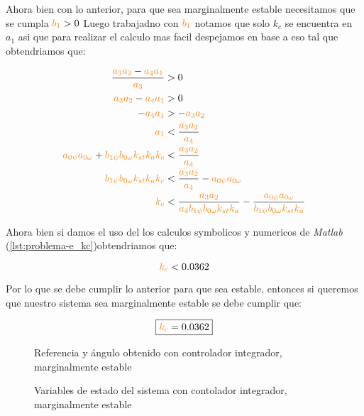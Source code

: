 Ahora bien con lo anterior, para que sea marginalmente estable necesitamos que se cumpla  \(\nara{b_1} > 0\)     
Luego trabajadno con $\nara{b_1}$ notamos que solo $k_c$ se encuentra en $a_1$
asi que para realizar el calculo mas facil despejamos en base a eso tal que obtendriamos que: 


\begin{align} 
  \frac{\nara{a_3 a_2} - \nara{a_4 a_1}}{\nara{a_3}} &> 0 \\
  \nara{a_3 a_2} - \nara{a_4 a_1} &> 0 \\
  - \nara{a_4 a_1} &> - \nara{a_3 a_2} \\
  \nara{a_1} &< \frac{\nara{a_3 a_2}}{\nara{a_4}} \\
  \nara{a_{0\psi} a_{0\omega}} + \nara{b_{1\psi} b_{0\omega} k_{st} k_a k_c} &< \frac{\nara{a_3 a_2}}{\nara{a_4}} \\
  \nara{b_{1\psi} b_{0\omega} k_{st} k_a k_c} &< \frac{\nara{a_3 a_2}}{\nara{a_4}} - \nara{a_{0\psi} a_{0\omega}} \\
  \nara{k_c}  &< \frac{\nara{a_3 a_2}}{\nara{a_4 b_{1\psi} b_{0\omega} k_{st} k_a}}  - \frac{\nara{a_{0\psi} a_{0\omega}}}{\nara{b_{1\psi} b_{0\omega} k_{st} k_a}}  \\
\end{align}

Ahora bien si damos el uso del los calculos symbolicos y numericos de \textit{Matlab} (\autoref{lst:problema-e_kc})obtendriamos que: 

\begin{equation}
  \nara{k_c} < 0.0362
\end{equation}

Por lo que se debe cumplir lo anterior para que sea estable, entonces si queremos que nuestro sistema sea marginalmente estable se debe cumplir que:

\begin{equation}
  \boxed{\nara{k_c} = 0.0362}
\end{equation}

\begin{figure}[h]
  \centering
  
  \caption{Referencia y ángulo obtenido con controlador integrador, marginalmente estable}\label{fig:psi-marge-int}
\end{figure}

\begin{figure}[h]
  \centering
  
  \caption{Variables de estado del sistema con contolador integrador, marginalmente estable}\label{fig:estado-marge-int}
\end{figure}

